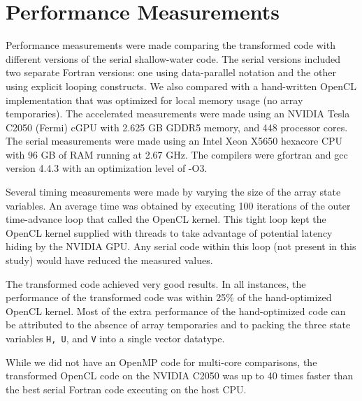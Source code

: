 \section{Performance Measurements}

Performance measurements were made comparing the transformed code with different
versions of the serial shallow-water code.  The serial versions included two
separate Fortran versions: one using data-parallel notation and the other using
explicit looping constructs.  We also compared with a hand-written OpenCL
implementation that was optimized for local memory usage (no array temporaries).
The accelerated measurements were made using an NVIDIA Tesla C2050 (Fermi) cGPU
with 2.625 GB GDDR5 memory, and 448 processor cores.  The serial measurements
were made using an Intel Xeon X5650 hexacore CPU with 96 GB of RAM running at
2.67 GHz.  The compilers were gfortran and gcc version 4.4.3 with an
optimization level of -O3.




Several timing measurements were made by varying the size of the array state
variables.  An average time was obtained by executing 100 iterations of the outer
time-advance loop that called the OpenCL kernel. This tight loop kept the OpenCL
kernel supplied with threads to take advantage of potential latency hiding by
the NVIDIA GPU.  Any serial code within this loop (not present in this study)
would have reduced the measured values.

The transformed code achieved very good results.  In all instances, the
performance of the transformed code was within 25\% of the hand-optimized OpenCL
kernel.  Most of the extra performance of the hand-optimized code can be
attributed to the absence of array temporaries and to packing the three state
variables {\tt H, U}, and {\tt V} into a single vector datatype.

While we did not have an OpenMP code for multi-core comparisons, the transformed
OpenCL code on the NVIDIA C2050 was up to 40 times faster than the best serial
Fortran code executing on the host CPU.


